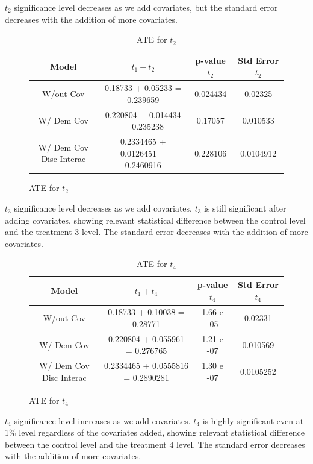 \documentclass{article}
\begin{document}
$t_2$ significance level decreases as we add covariates, but the standard error decreases with the addition of more covariates.

\begin{figure}[H]
  \begin{table}[H]
  \centering
  \label{tab:}
  \begin{tabular}{|cccc|}
    \hline
    Model & $t_1 + t_2$ & p-value $t_2$ & Std Error $t_2$ \\
    \hline
    W/out Cov                & 0.18733 + 0.05233 = 0.239659 & 0.024434         & 0.02325 \\ 
    W/ Dem Cov               & 0.220804 + 0.014434 = 0.235238 & 0.17057        & 0.010533 \\   
    W/ Dem Cov Disc Interac  & 0.2334465 + 0.0126451 = 0.2460916 & 0.228106    & 0.0104912 \\       
    \hline
  \end{tabular}
  \caption{ATE for $t_2$}
\end{table}
\end{figure}

$t_3$ significance level decreases as we add covariates. $t_3$ is still significant after adding covariates, showing relevant statistical difference between the control level and the treatment 3 level. The standard error decreases with the addition of more covariates.

\begin{figure}[H]
\begin{table}[H]
  \centering
  \label{tab:}
  \begin{tabular}{|cccc|}
    \hline
    Model & $t_1 + t_4$ & p-value $t_4$ & Std Error $t_4$ \\
    \hline
    W/out Cov                & 0.18733 + 0.10038 = 0.28771 & 1.66 e -05          & 0.02331 \\
    W/ Dem Cov               & 0.220804 + 0.055961 = 0.276765 & 1.21 e -07       & 0.010569 \\ 
    W/ Dem Cov Disc Interac  & 0.2334465 + 0.0555816 = 0.2890281 & 1.30 e -07    & 0.0105252 \\   
    \hline
  \end{tabular}
  \caption{ATE for $t_4$}
\end{table}
\end{figure}

$t_4$ significance level increases as we add covariates. $t_4$ is highly significant even at 1\% level regardless of the covariates added, showing relevant statistical difference between the control level and the treatment 4 level.  The standard error decreases with the addition of more covariates.
\end{document}
